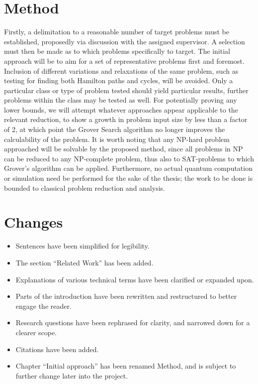 \documentclass[msc,lith,english]{liuthesis}
\begin{document}
\chapter{Method}
Firstly, a delimitation to a reasonable number of target problems must be established, proposedly via discussion with the assigned supervisor. A selection must then be made as to which problems specifically to target. The initial approach will be to aim for a set of representative problems first and foremost. Inclusion of different variations and relaxations of the same problem, such as testing for finding both Hamilton paths and cycles, will be avoided. Only a particular class or type of problem tested should yield particular results, further problems within the class may be tested as well. For potentially proving any lower bounds, we will attempt whatever approaches appear applicable to the relevant reduction, to show a growth in problem input size by less than a factor of 2, at which point the Grover Search algorithm no longer improves the calculability of the problem. It is worth noting that any NP-hard problem approached will be solvable by the proposed method, since all problems in NP can be reduced to any NP-complete problem, thus also to SAT-problems to which Grover’s algorithm can be applied. Furthermore, no actual quantum computation or simulation need be performed for the sake of the thesis; the work to be done is bounded to classical problem reduction and analysis.

\appendix
\chapter{Changes}
\begin{itemize}
    \item Sentences have been simplified for legibility.
    \item The section ``Related Work'' has been added.
    \item Explanations of various technical terms have been clarified or expanded upon.
    \item Parts of the introduction have been rewritten and restructured to better engage the reader.
    \item Research questions have been rephrased for clarity, and narrowed down for a clearer scope.
    \item Citations have been added.
    \item Chapter ``Initial approach'' has been renamed Method, and is subject to further change later into the project.
\end{itemize}

\printbibliography
\end{document}
